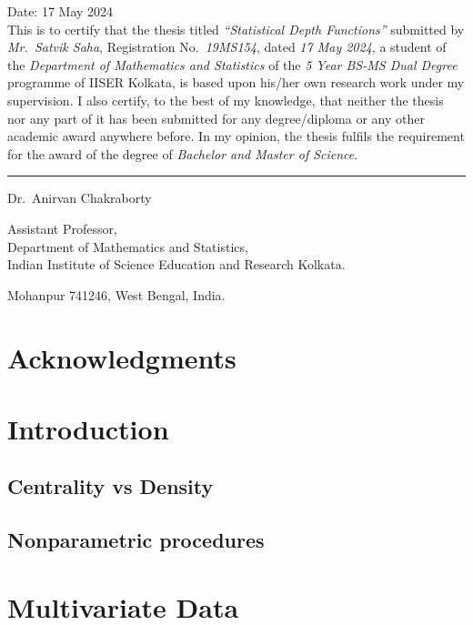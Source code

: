 \documentclass[12pt]{report}
\begin{document}
    Date: 17 May 2024\\

    This is to certify that the thesis titled \emph{``Statistical Depth
    Functions''} submitted by \emph{Mr.~Satvik Saha}, Registration
    No.~\emph{19MS154}, dated \emph{17 May 2024}, a student of the
    \textit{Department of Mathematics and Statistics} of the \textit{5 Year
    BS-MS Dual Degree} programme of IISER Kolkata, is based upon his/her own
    research work under my supervision.
    I also certify, to the best of my knowledge, that neither the thesis nor
    any part of it has been submitted for any degree/diploma or any other
    academic award anywhere before.
    In my opinion, the thesis fulfils the requirement for the award of the
    degree of \emph{Bachelor and Master of Science}.

    \vspace{5em}
    \rule{0.4\textwidth}{0.8pt}

    \vspace{0.1em}
    Dr.~Anirvan Chakraborty

    Assistant Professor,\\
    Department of Mathematics and Statistics,\\
    Indian Institute of Science Education and Research Kolkata.

    Mohanpur 741246, West Bengal, India.



    \chapter*{Acknowledgments}


    \tableofcontents


    \chapter{Introduction}
    

    \section{Centrality vs Density}
    \section{Nonparametric procedures}


    \chapter{Multivariate Data}
    
\end{document}
